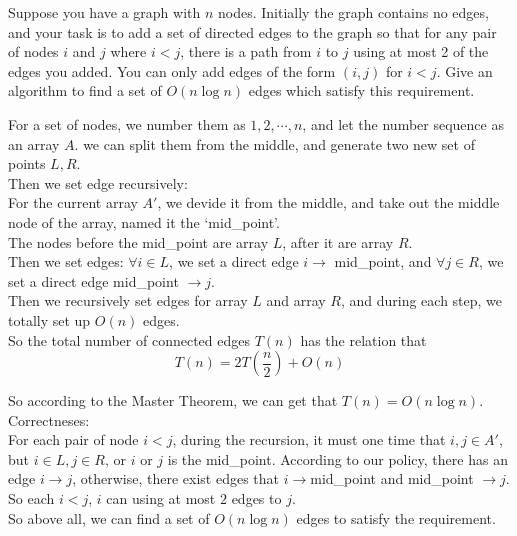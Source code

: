 \problem{}

Suppose you have a graph with $n$ nodes. Initially the graph contains no edges, and your task is to add a set of directed edges to the graph so that for any pair of nodes $i$ and $j$ where $i < j$, there is a path from $i$ to $j$ using at most 2 of the edges you added. You can only add edges of the form $(i,j)$ for $i < j$.  Give an algorithm to find a set of $O(n \log n)$ edges which satisfy this requirement.

\solution{}


For a set of nodes, we number them as $1,2,\cdots, n$, and let the number sequence as an array $A$.
we can split them from the middle, and generate two new set of points $L,R$.\\

Then we set edge recursively:\\
For the current array $A'$, we devide it from the middle, and take out the middle node of the array, named it the `mid\_point'.\\
The nodes before the mid\_point are array $L$, after it are array $R$.\\

Then we set edges: $\forall i\in L$, we set a direct edge $i\to$ mid\_point, and $\forall j\in R$, we set a direct edge  mid\_point $\to j$.\\
Then we recursively set edges for array $L$ and array $R$, and during each step, we totally set up $O(n)$ edges.\\

So the total number of connected edges $T(n)$ has the relation that 
$$T(n)=2T(\dfrac{n}{2})+O(n)$$

So according to the Master Theorem, we can get that $T(n)=O(n\log n)$.\\

Correctneses:\\
For each pair of node $i<j$, during the recursion, it must one time that $i,j\in A'$, but $i\in L, j\in R$, or $i$ or $j$ is the mid\_point. According to our policy, there has an edge $i\to j$, otherwise, there exist edges that $i\to$mid\_point and mid\_point $\to j$.\\
So each $i<j$, $i$ can using at most $2$ edges to $j$.\\

So above all, we can find a set of $O(n\log n)$ edges to satisfy the requirement.

\newpage